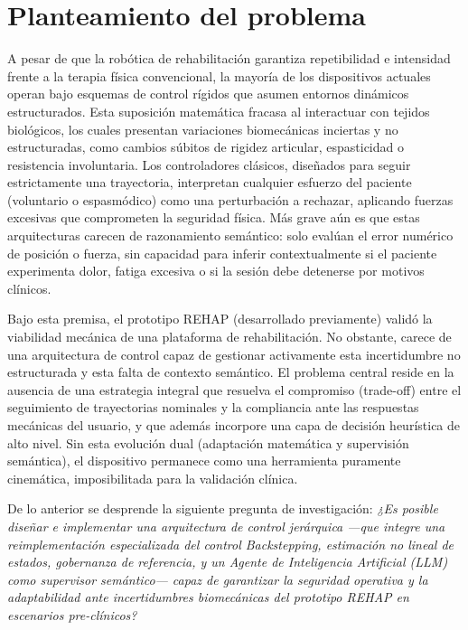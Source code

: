 \documentclass[a4paper,12pt]{article}
\begin{document}
\newpage
\section{Planteamiento del problema}

A pesar de que la robótica de rehabilitación garantiza repetibilidad e intensidad frente a la terapia física convencional, la mayoría de los dispositivos actuales operan bajo esquemas de control rígidos que asumen entornos dinámicos estructurados. Esta suposición matemática fracasa al interactuar con tejidos biológicos, los cuales presentan variaciones biomecánicas inciertas y no estructuradas, como cambios súbitos de rigidez articular, espasticidad o resistencia involuntaria. Los controladores clásicos, diseñados para seguir estrictamente una trayectoria, interpretan cualquier esfuerzo del paciente (voluntario o espasmódico) como una perturbación a rechazar, aplicando fuerzas excesivas que comprometen la seguridad física. Más grave aún es que estas arquitecturas carecen de razonamiento semántico: solo evalúan el error numérico de posición o fuerza, sin capacidad para inferir contextualmente si el paciente experimenta dolor, fatiga excesiva o si la sesión debe detenerse por motivos clínicos.

Bajo esta premisa, el prototipo REHAP (desarrollado previamente) validó la viabilidad mecánica de una plataforma de rehabilitación. No obstante, carece de una arquitectura de control capaz de gestionar activamente esta incertidumbre no estructurada y esta falta de contexto semántico. El problema central reside en la ausencia de una estrategia integral que resuelva el compromiso (trade-off) entre el seguimiento de trayectorias nominales y la compliancia ante las respuestas mecánicas del usuario, y que además incorpore una capa de decisión heurística de alto nivel. Sin esta evolución dual (adaptación matemática y supervisión semántica), el dispositivo permanece como una herramienta puramente cinemática, imposibilitada para la validación clínica.

De lo anterior se desprende la siguiente pregunta de investigación: \textit{¿Es posible diseñar e implementar una arquitectura de control jerárquica —que integre una reimplementación especializada del control Backstepping, estimación no lineal de estados, gobernanza de referencia, y un Agente de Inteligencia Artificial (LLM) como supervisor semántico— capaz de garantizar la seguridad operativa y la adaptabilidad ante incertidumbres biomecánicas del prototipo REHAP en escenarios pre-clínicos?}
\end{document}
